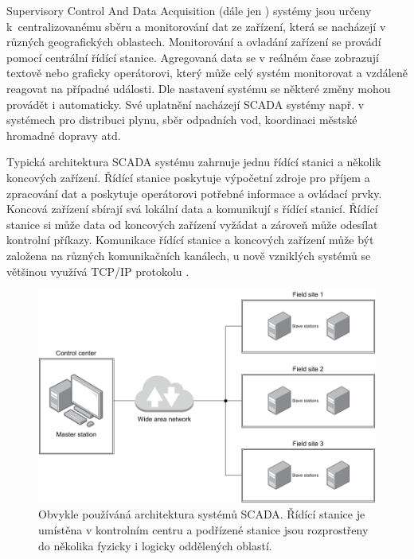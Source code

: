 Supervisory Control And Data Acquisition (dále jen ) systémy jsou určeny k~centralizovanému sběru a monitorování dat ze zařízení, která se nacházejí v různých geografických oblastech. Monitorování a ovladání zařízení se provádí pomocí centrální řídící stanice. Agregovaná data se v reálném čase zobrazují textově nebo graficky operátorovi, který může celý systém monitorovat a vzdáleně reagovat na případné události. Dle nastavení systému se některé změny mohou provádět i automaticky. Své uplatnění nacházejí SCADA systémy např. v systémech pro distribuci plynu, sběr odpadních vod, koordinaci městské hromadné dopravy atd. 

Typická architektura SCADA systému zahrnuje jednu řídící stanici a několik koncových zařízení. Řídící stanice poskytuje výpočetní zdroje pro příjem a zpracování dat a poskytuje operátorovi potřebné informace a ovládací prvky. Koncová zařízení sbírají svá lokální data a komunikují s řídící stanicí. Řídící stanice si může data od koncových zařízení vyžádat a zároveň může odesílat kontrolní příkazy. Komunikace řídící stanice a koncových zařízení může být založena na různých komunikačních kanálech, u nově vzniklých systémů se většinou využívá TCP/IP protokolu
\cite{ics_security}.

\begin{figure}[H]
	\centering
	\includegraphics[width=1\textwidth]{obrazky-figures/scada_arch.pdf}
	\caption{Obvykle používáná architektura systémů SCADA. Řídící stanice je umístěna v kontrolním centru a podřízené stanice jsou rozprostřeny do několika fyzicky i logicky oddělených oblastí.}
	\label{fig:scada_arch}
\end{figure}


